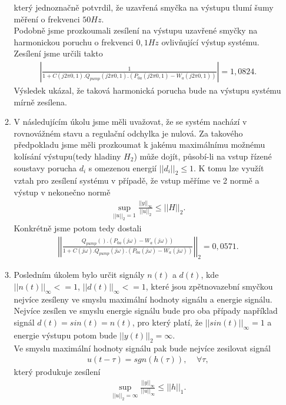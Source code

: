 \documentclass[12pt,a4paper]{article}
\begin{document}
\begin{enumerate}[I.]
\begin{enumerate}[1.]
				který jednoznačně potvrdil, že uzavřená smyčka na výstupu tlumí šumy měření o frekvenci $50Hz$.\\
				Podobně jsme prozkoumali zesílení na výstupu uzavřené smyčky na harmonickou poruchu o frekvenci $0{,}1 Hz$ ovlivňující výstup systému. Zesílení jsme určili takto
				\begin{gather*}
				 \left|\frac{1}{1+C(j2\pi 0{,}1).Q_{pump}(j2\pi 0{,}1).(P_{0a}(j2\pi 0{,}1)-W_a(j2\pi 0{,}1))}\right| = 1{,}0824.
				\end{gather*}
				Výsledek ukázal, že taková harmonická porucha bude na výstupu systému mírně zesílena.\\
				\item
				V následujícím úkolu jsme měli uvažovat, že se systém nachází v rovnovážném stavu a regulační odchylka je nulová. Za takového předpokladu jsme měli prozkoumat k jakému maximálnímu možnému kolísání výstupu(tedy hladiny $H_2$) může dojít, působí-li na vstup řízené soustavy porucha $d_i$ s omezenou energií $||d_i||_2 \leq 1$. K tomu lze využít vztah pro zesílení systému v případě, že vstup měříme ve 2 normě a výstup v nekonečno normě
				\begin{gather}
				\sup_{||u||_2=1} \frac{||y||_\infty}{||u||_2} \leq ||H||_2.
				\end{gather}
				Konkrétně jsme potom tedy dostali
				\begin{gather*}
				\left|\left|\frac{Q_{pump}().(P_{0a}(j\omega)-W_a(j\omega))}{1+C(j\omega).Q_{pump}(j\omega).(P_{0a}(j\omega)-W_a(j\omega))}\right|\right|_2 = 0{,}0571.
				\end{gather*}
				\item
				Posledním úkolem bylo určit signály $n(t)$ a $d(t)$, kde $||n(t)||_\infty <= 1$, $||d(t)||_\infty <= 1$, které jsou zpětnovazební smyčkou nejvíce zesíleny ve smyslu maximální hodnoty signálu a energie signálu.\\
				Nejvíce zesílen ve smyslu energie signálu bude pro oba případy například signál $d(t) = sin(t) = n(t)$, pro který platí, že $||sin(t)||_\infty = 1$ a energie výstupu potom bude $||y(t)||_2 = \infty$.\\
				Ve smyslu maximální hodnoty signálu pak bude nejvíce zesilovat signál
				\begin{gather*}
				u(t-\tau) = sgn(h(\tau)), \;\;\;\; \forall \tau,
				\end{gather*}
				který produkuje zesílení
				\begin{gather*}
				\sup_{||u||_2=\infty} \frac{||y||_\infty}{||u||_\infty} \leq ||h||_1.

\end{gather*}
\end{enumerate}
\end{enumerate}
\end{document}
